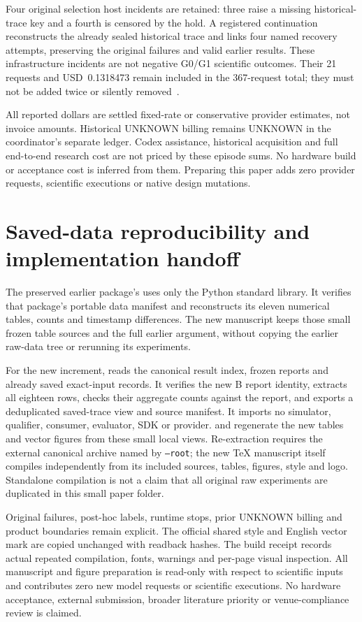 Four original selection host incidents are retained: three raise
a missing historical-trace key and a fourth is censored by the
hold. A registered continuation reconstructs the already sealed
historical trace and links four named recovery attempts, preserving
the original failures and valid earlier results. These infrastructure
incidents are not negative G0/G1 scientific outcomes. Their 21
requests and USD~0.1318473 remain included in the 367-request
total; they must not be added twice or silently removed~\cite{repair}.

All reported dollars are settled fixed-rate or conservative provider
estimates, not invoice amounts. Historical UNKNOWN billing remains
UNKNOWN in the coordinator's separate ledger. Codex assistance,
historical acquisition and full end-to-end research cost are not
priced by these episode sums. No hardware build or acceptance cost
is inferred from them. Preparing this paper adds zero provider
requests, scientific executions or native design mutations.

\section{Saved-data reproducibility and implementation handoff}
The preserved earlier package's  uses only the Python
standard library. It verifies that package's
portable data manifest and reconstructs its eleven numerical tables,
counts and timestamp differences. The new manuscript keeps those small
frozen table sources and the full earlier argument, without copying the
earlier raw-data tree or rerunning its experiments.

For the new increment,  reads the canonical result
index, frozen reports and already saved exact-input records. It verifies the
new B report identity, extracts all eighteen rows, checks their aggregate
counts against the report, and exports a deduplicated saved-trace view and
source manifest. It imports no simulator, qualifier, consumer, evaluator,
SDK or provider.  and  regenerate
the new tables and vector figures from these small local views. Re-extraction
requires the external canonical archive named by \texttt{--root}; the new
TeX manuscript itself compiles independently from its included sources,
tables, figures, style and logo. Standalone compilation is not a claim that
all original raw experiments are duplicated in this small paper folder.

Original failures, post-hoc labels, runtime stops, prior UNKNOWN billing and
product boundaries remain explicit. The official shared style and English
vector mark are copied unchanged with readback hashes. The build receipt
records actual repeated compilation, fonts, warnings and per-page visual
inspection. All manuscript and figure preparation is read-only with respect
to scientific inputs and contributes zero new model requests or scientific
executions. No hardware acceptance, external submission, broader literature
priority or venue-compliance review is claimed.

